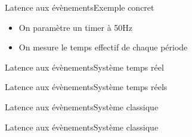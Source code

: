 \begin{frame}{Latence aux évènements}{Exemple concret}
  \begin{itemize}
  \item On paramètre un timer à 50Hz
  \item On mesure le temps effectif de chaque période
  \end{itemize}
  \begin{center}
  \end{center}
\end{frame}

\begin{frame}{Latence aux évènements}{Système temps réel}
  \begin{center}
  \end{center}
\end{frame}

\begin{frame}{Latence aux évènements}{Système temps réels}
  \begin{center}
  \end{center}
\end{frame}

\begin{frame}{Latence aux évènements}{Système classique}
  \begin{center}
  \end{center}
\end{frame}

\begin{frame}{Latence aux évènements}{Système classique}
  \begin{center}
  \end{center}
\end{frame}


